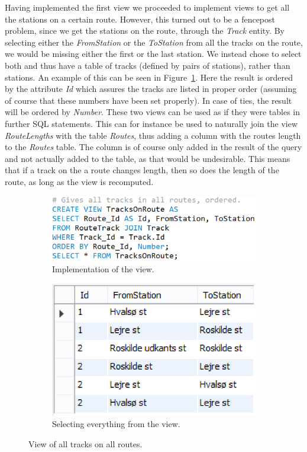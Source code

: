 Having implemented the first view we proceeded to implement views to get all 
the stations on a certain route. However, this turned out to be a fencepost 
problem, since we get the stations on the route, through the \emph{Track} 
entity. By selecting either the \emph{FromStation} or the \emph{ToStation} from 
all the tracks on the route, we would be missing either the first or the last 
station. We instead chose to select both and thus have a table of tracks 
(defined by pairs of stations), rather than stations. An example of this can be 
seen in Figure~\ref{fig:route}. Here the result is ordered by the attribute 
\emph{Id} which assures the tracks are listed in proper order (assuming of 
course that these numbers have been set properly). In case of ties, the result will be ordered by \emph{Number}. These two views can be used 
as if they were tables in further SQL statements. This can for instance be used 
to naturally join the view \emph{RouteLengths} with the table \emph{Routes}, 
thus adding a column with the routes length to the \emph{Routes} table. The 
column is of course only added in the result of the query and not actually 
added to the table, as that would be undesirable. This means that if a track on 
the a route changes length, then so does the length of the route, as long as 
the view is recomputed.

\begin{figure}[h]
    \centering
    \begin{subfigure}[b]{0.45 \textwidth}
        \centering
        \includegraphics[width=\textwidth]{img/TracksOnRoute}
        \caption{Implementation of the view.}
    \end{subfigure}
    \begin{subfigure}[b]{0.45 \textwidth}
        \centering
        \includegraphics{img/RouteView}
        \caption{Selecting everything from the view.}
    \end{subfigure}
    \caption{View of all tracks on all routes.}
    \label{fig:route}
\end{figure}

